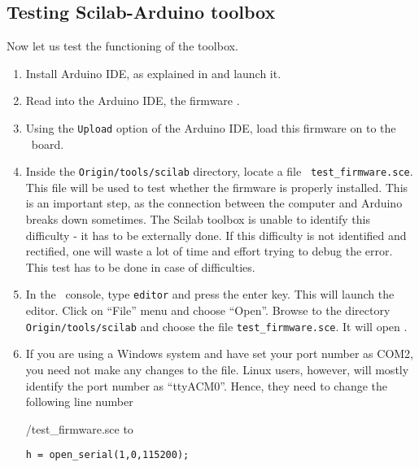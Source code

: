 \subsection{Testing Scilab-Arduino toolbox}
\label{sec:testing-scilab-arduino}
Now let us test the functioning of the toolbox. 
\begin{enumerate}
      \item Install Arduino IDE, as explained in  and
            launch it.
      \item Read into the Arduino IDE, the firmware .
      \item Using the {\tt Upload} option of the Arduino IDE, load this
            firmware on to the \arduino\ board.
      \item Inside the {\tt Origin/tools/scilab} directory, locate a file {\tt
                        test\_firmware.sce}. This file will be used to test whether the
            firmware is properly installed.  This is an important step, as the
            connection between the computer and Arduino breaks down sometimes.
            The Scilab toolbox is unable to identify this difficulty - it has to
            be externally done.  If this difficulty is not identified and
            rectified, one will waste a lot of time and effort trying to debug
            the error.  This test has to be done in case of difficulties.
      \item In the \scilab\ console, type {\tt editor} and press the enter
            key. This will launch the editor. Click on ``File'' menu and choose
            ``Open''. Browse to the directory {\tt Origin/tools/scilab} and choose the
            file {\tt test\_firmware.sce}.  It will open
            .  
            
      \item If you are using a Windows system and have set your port number
            as COM2, you need not make any changes to the file. Linux users,
            however, will mostly identify the port number as ``ttyACM0''. Hence, 
            they need to change the following line number
            
            {\LocSWchkcode/test_firmware.sce}
            to
            \begin{lstlisting}[style=nonumbers]
  h = open_serial(1,0,115200); 
\end{lstlisting}
            

\end{enumerate}
